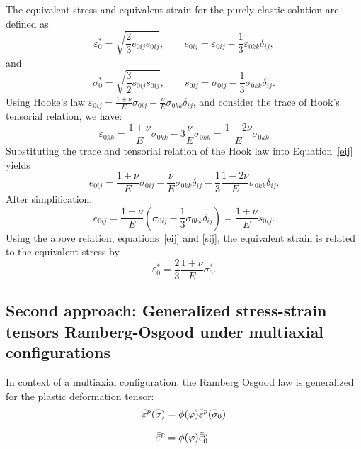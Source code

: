 \documentclass[10pt,a4paper]{article}
\begin{document}
The equivalent stress and equivalent strain for the purely elastic solution are defined as
\begin{equation}
\varepsilon_0^* = \sqrt{\frac{2}{3}e_{0ij}e_{0ij}}, \qquad e_{0ij} = \varepsilon_{0ij} - \frac{1}{3}\varepsilon_{0kk}\delta_{ij}, \label{eij}
\end{equation}
and
\begin{equation}
\sigma_0^* = \sqrt{\frac{3}{2}s_{0ij}s_{0ij}}, \qquad s_{0ij} = \sigma_{0ij} - \frac{1}{3}\sigma_{0kk}\delta_{ij}. \label{sij}
\end{equation}
Using Hooke's law $\varepsilon_{0ij} = \frac{1+\nu}{E}\sigma_{0ij} - \frac{\nu}{E}\sigma_{0kk}\delta_{ij} $, and consider the trace of Hook's tensorial relation, we have:
\begin{equation*}
\varepsilon_{0kk} = \frac{1+\nu}{E}\sigma_{0kk} - 3\frac{\nu}{E}\sigma_{0kk} = \frac{1-2\nu}{E}\sigma_{0kk}
\end{equation*}
Substituting the trace and tensorial relation of the Hook law into Equation~\eqref{eij} yields
\begin{equation*}
e_{0ij} = \frac{1+\nu}{E}\sigma_{0ij} - \frac{\nu}{E}\sigma_{0kk}\delta_{ij} - \frac{1}{3}\frac{1-2\nu}{E}\sigma_{0kk}\delta_{ij}. \label{eij3}
\end{equation*}
After simplification,
\begin{equation*}
e_{0ij} = \frac{1+\nu}{E} \left( \sigma_{0ij} - \frac{1}{3}\sigma_{0kk}\delta_{ij} \right) = \frac{1+\nu}{E}s_{0ij}.
\end{equation*}
Using the above relation, equations~\eqref{eij} and \eqref{sij}, the equivalent strain is related to the equivalent stress by
\begin{equation}
\varepsilon_0^* = \frac{2}{3}\frac{1+\nu}{E}\sigma_0^*.
\label{e_final}
\end{equation}

\subsection{Second approach: Generalized stress-strain tensors Ramberg-Osgood under multiaxial configurations}
\label{sec:secondApproach}

In context of a multiaxial configuration, the Ramberg Osgood law is generalized for the plastic deformation tensor:
\begin{align} 
\bar{\bar\varepsilon}^p(\bar{\bar\sigma}) &= \phi(\varphi)  \bar{\bar\varepsilon}^p(\bar{\bar\sigma}_0)  \notag \\[3mm]
\bar{\bar\varepsilon}^p &= \phi(\varphi)  \bar{\bar\varepsilon}_0^p
\label{eq:plastic_tensor}
\end{align}
\end{document}
